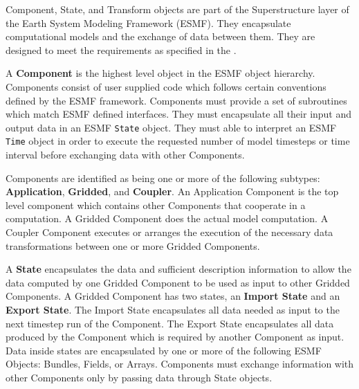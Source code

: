 %


Component, State, and Transform objects are part of the Superstructure 
layer of the Earth System Modeling Framework (ESMF).  They encapsulate
computational models and the exchange of data between them.
They are designed to meet the requirements as specified in the
.

A {\bf Component} 
is the highest level object in the ESMF object
hierarchy.  Components consist of user supplied code
which follows certain conventions defined by the ESMF framework. 
Components must provide a set of subroutines which match ESMF
defined interfaces. They must encapsulate
all their input and output data in an ESMF {\tt State} object.  They
must able to interpret an ESMF {\tt Time} object in order
to execute the requested number of model timesteps or time interval
before exchanging data with other Components.

Components are identified as being one or more of the
following subtypes: {\bf Application}, {\bf Gridded}, and {\bf Coupler}.  
An Application Component is the top level component which
contains other Components that cooperate in a computation. 
A Gridded Component
does the actual model computation.  A Coupler Component executes or
arranges the execution of the necessary data transformations between one
or more Gridded Components.


A {\bf State} 
encapsulates the data and sufficient description information
to allow the data computed by one Gridded Component to be
used as input to other Gridded Components.  A Gridded Component has
two states, an {\bf Import State} and an {\bf Export State}.
The Import State encapsulates all data needed as input to the
next timestep run of the Component.  The Export State encapsulates 
all data produced by the Component which is required by another
Component as input.  Data inside states are encapsulated by one 
or more of the following ESMF Objects: Bundles, Fields, or Arrays.
Components must exchange information with other Components
only by passing data through State objects.

